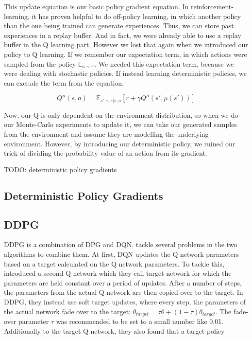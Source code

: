\documentclass[hyperref,german,beleg]{cgvpub}
\begin{document}
This update equation is our basic policy gradient equation. In reinforcement-learning, it has proven helpful to do off-policy learning, in which another policy than the one being trained can generate experiences. Thus, we can store past experiences in a replay buffer. And in fact, we were already able to use a replay buffer in the Q learning part. However we lost that again when we introduced our policy to Q learning. If we remember our expectation term, in which actions were sampled from the policy $\mathbb{E}_{a \sim \pi}$. We needed this expectation term, because we were dealing with stochastic policies. If instead learning deterministic policies, we can exclude the term from the equation. 

\begin{equation}
Q^{\mu}(s,a) = \mathbb{E}_{s' \sim \varepsilon | s,a}[r + \gamma Q^{\mu}(s', \mu(s'))]
\end{equation}

Now, our Q is only dependent on the environment distribution, so when we do our Monte-Carlo experiments to update it, we can take our generated samples from the environment and assume they are modelling the underlying environment. However, by introducing our deterministic policy, we ruined our trick of dividing the probability value of an action from its gradient.

TODO: deterministic policy gradients


\subsection{Deterministic Policy Gradients}


\subsection{DDPG}

\ac{DDPG} is a combination of \ac{DPG} and \ac{DQN}. \cite{lillicrapCONTINUOUSCONTROLDEEP2015} tackle several problems in the two algorithms to combine them. At first, \ac{DQN} updates the Q network parameters based on a target calculated on the Q network parameters. To tackle this, \cite{mnihPlayingAtariDeep2013} introduced a second Q network which they call target network for which the parameters are held constant over a period of updates. After a number of steps, the parameters from the actual Q network are then copied over to the target. In \ac{DDPG}, they instead use soft target updates, where every step, the parameters of the actual network fade over to the target: $\theta_{target} = \tau \theta + (1 - \tau) \theta_{target}$. The fade-over parameter $\tau$ was recommended to be set to a small number like 0.01. Additionally to the target Q-network, they also found that a target policy 
\end{document}
